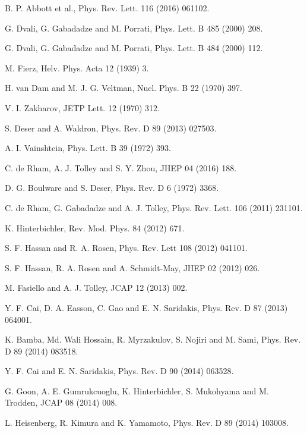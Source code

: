 \documentclass[aps]{revtex4}
\begin{document}

\begin{thebibliography}{999}
 B. P. Abbott et al., Phys. Rev. Lett. 116 (2016) 061102.

 G. Dvali, G. Gabadadze and M. Porrati, Phys. Lett. B 485
(2000) 208.

 G. Dvali, G. Gabadadze and M. Porrati, Phys. Lett. B 484
(2000) 112.

 M. Fierz, Helv. Phys. Acta 12 (1939) 3.

 H. van Dam and M. J. G. Veltman, Nucl. Phys. B 22 (1970)
397.

 V. I. Zakharov, JETP Lett. 12 (1970) 312.

 S. Deser and A. Waldron, Phys. Rev. D 89 (2013) 027503.

 A. I. Vainshtein, Phys. Lett. B 39 (1972) 393.


 C. de Rham, A. J. Tolley and S. Y. Zhou, JHEP 04 (2016)
188.


 D. G. Boulware and S. Deser, Phys. Rev. D 6 (1972) 3368.

 C. de Rham, G. Gabadadze and A. J. Tolley, Phys. Rev.
Lett. 106 (2011) 231101.

 K. Hinterbichler, Rev. Mod. Phys. 84 (2012) 671.

 S. F. Hassan and R. A. Rosen, Phys. Rev. Lett 108 (2012)
041101.

 S. F. Hassan, R. A. Rosen and A. Schmidt-May, JHEP 02
(2012) 026.

 M. Fasiello and A. J. Tolley, JCAP 12 (2013) 002.

 Y. F. Cai, D. A. Easson, C. Gao and E. N. Saridakis, Phys.
Rev. D 87 (2013) 064001.

 K. Bamba, Md. Wali Hossain, R. Myrzakulov, S. Nojiri and
M. Sami, Phys. Rev. D 89 (2014) 083518.

 Y. F. Cai and E. N. Saridakis, Phys. Rev. D 90 (2014) 063528.

 G. Goon, A. E. Gumrukcuoglu, K. Hinterbichler, S. Mukohyama
and M. Trodden, JCAP 08 (2014) 008.

 L. Heisenberg, R. Kimura and K. Yamamoto, Phys. Rev.
D 89 (2014) 103008.


\end{thebibliography}
\end{document}
